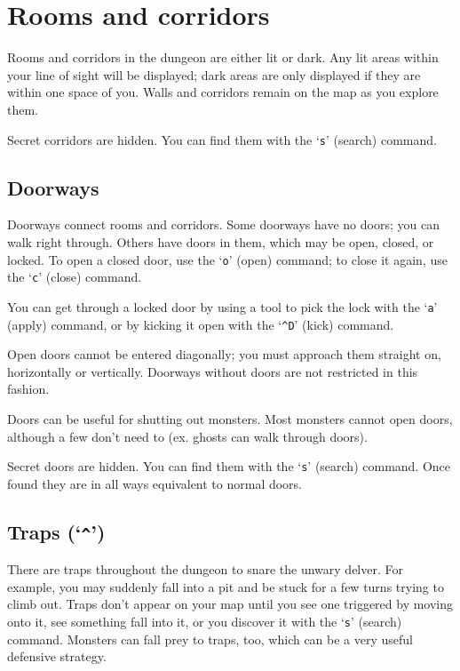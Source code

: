 \elist
\nd %
\section{Rooms and corridors}


Rooms and corridors in the dungeon are either lit or dark.
Any lit areas within your line of sight will be displayed;  
dark areas are only displayed if they are within one space of you.
Walls and corridors remain on the map as you explore them.

Secret corridors are hidden.  You can find them with the `{\tt s}' (search)
command.
\subsection*{Doorways}


Doorways connect rooms and corridors.  Some doorways have no doors;
you can walk right through.  Others have doors in them, which may be
open, closed, or locked.  To open a closed door, use the `{\tt o}' (open)
command; to close it again, use the `{\tt c}' (close) command.

You can get through a locked door by using a tool to pick the lock
with the `{\tt a}' (apply) command, or by kicking it open with the `{\tt \^{}D}'
(kick) command.

Open doors cannot be entered diagonally; you must approach them
straight on, horizontally or vertically.  Doorways without doors are
not restricted in this fashion.

Doors can be useful for shutting out monsters.  Most monsters cannot
open doors, although a few don't need to (ex. ghosts can walk through
doors).

Secret doors are hidden.  You can find them with the `{\tt s}' (search)
command.  Once found they are in all ways equivalent to normal doors.
\subsection*{Traps (`{\tt \^{}}')}


There are traps throughout the dungeon to snare the unwary delver.
For example, you may suddenly fall into a pit and be stuck for a few
turns trying to climb out.  Traps don't appear on your map until you
see one triggered by moving onto it, see something fall into it, or you
discover it with the `{\tt s}' (search) command.  Monsters can fall prey to
traps, too, which can be a very useful defensive strategy.

